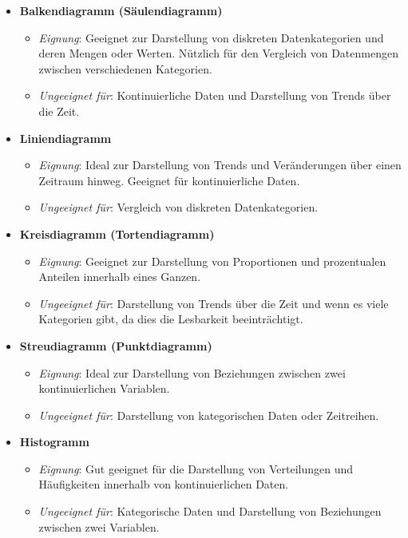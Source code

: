 \documentclass[11pt, oneside]{book}
\begin{document}
\begin{itemize}
    \item \textbf{Balkendiagramm (Säulendiagramm)}
    \begin{itemize}
        \item \textit{Eignung}: Geeignet zur Darstellung von diskreten Datenkategorien und deren Mengen oder Werten. Nützlich für den Vergleich von Datenmengen zwischen verschiedenen Kategorien.
        \item \textit{Ungeeignet für}: Kontinuierliche Daten und Darstellung von Trends über die Zeit.
    \end{itemize}
    
    \item \textbf{Liniendiagramm}
    \begin{itemize}
        \item \textit{Eignung}: Ideal zur Darstellung von Trends und Veränderungen über einen Zeitraum hinweg. Geeignet für kontinuierliche Daten.
        \item \textit{Ungeeignet für}: Vergleich von diskreten Datenkategorien.
    \end{itemize}
    
    \item \textbf{Kreisdiagramm (Tortendiagramm)}
    \begin{itemize}
        \item \textit{Eignung}: Geeignet zur Darstellung von Proportionen und prozentualen Anteilen innerhalb eines Ganzen.
        \item \textit{Ungeeignet für}: Darstellung von Trends über die Zeit und wenn es viele Kategorien gibt, da dies die Lesbarkeit beeinträchtigt.
    \end{itemize}
    
    \item \textbf{Streudiagramm (Punktdiagramm)}
    \begin{itemize}
        \item \textit{Eignung}: Ideal zur Darstellung von Beziehungen zwischen zwei kontinuierlichen Variablen.
        \item \textit{Ungeeignet für}: Darstellung von kategorischen Daten oder Zeitreihen.
    \end{itemize}
    
    \item \textbf{Histogramm}
    \begin{itemize}
        \item \textit{Eignung}: Gut geeignet für die Darstellung von Verteilungen und Häufigkeiten innerhalb von kontinuierlichen Daten.
        \item \textit{Ungeeignet für}: Kategorische Daten und Darstellung von Beziehungen zwischen zwei Variablen.
    \end{itemize}
    

\end{itemize}
\end{document}
